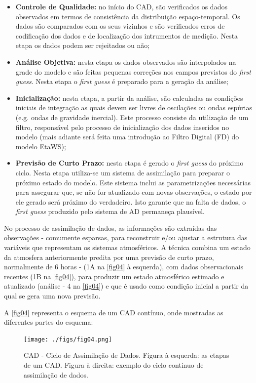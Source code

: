 \begin{itemize}
\item \textbf{Controle de Qualidade:} no início do CAD, são verificados os dados observados em termos de consistência da distribuição espaço-temporal. Os dados são comparados com os seus vizinhos e são verificados erros de codificação dos dados e de localização dos intrumentos de medição. Nesta etapa os dados podem ser rejeitados ou não;
\item \textbf{Análise Objetiva:} nesta etapa os dados observados são interpolados na grade do modelo e são feitas pequenas correções nos campos previstos do \textit{first guess}. Nesta etapa o \textit{first guess} é preparado para a geração da análise;
\item \textbf{Inicialização:} nesta etapa, a partir da análise, são calculadas as condições iniciais de integração as quais devem ser livres de oscilações ou ondas espúrias (e.g. ondas de gravidade inercial). Este processo consiste da utilização de um filtro, responsável pelo processo de inicialização  dos dados inseridos no modelo (mais adiante será feita uma introdução ao Filtro Digital (FD) do modelo EtaWS);
\item \textbf{Previsão de Curto Prazo:} nesta etapa é gerado o \textit{first guess} do próximo ciclo. Nesta etapa utiliza-se um sistema de assimilação para preparar o próximo estado do modelo. Este sistema inclui as parametrizações necessárias para assegurar que, se não for atualizado com novas observações, o estado por ele gerado será próximo do verdadeiro. Isto garante que na falta de dados, o \textit{first guess} produzido pelo sistema de AD permaneça plausível.
\end{itemize}

No processo de assimilação de dados, as informações são extraídas das observações - comumente esparsas, para reconstruir e/ou ajustar a estrutura das variáveis que representam os sistemas atmosféricos. A técnica combina um estado da atmosfera anteriormente predita por uma previsão de curto prazo, normalmente de 6 horas - (1A na \autoref{fig04} à esquerda), com dados observacionais recentes (1B na \autoref{fig04}), para produzir um estado atmosférico estimado e atualizado (análise - 4 na \autoref{fig04}) e que é usado como condição inicial a partir da qual se gera uma nova previsão.

A \autoref{fig04} representa o esquema de um CAD contínuo, onde mostradas as diferentes partes do esquema:

\begin{figure}[!hbp]
\centering
\texttt{[image: ./figs/fig04.png]}
\caption{CAD - Ciclo de Assimilação de Dados. Figura à esquerda: as etapas de um CAD. Figura à direita: exemplo do ciclo contínuo de assimilação de dados.}
\label{fig04}
\end{figure}

